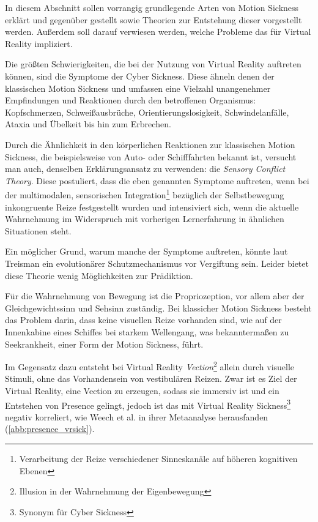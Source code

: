 In diesem Abschnitt sollen vorrangig grundlegende Arten von Motion Sickness erkl\"art und gegen\"uber gestellt sowie Theorien zur Entstehung dieser vorgestellt werden. Au{\ss}erdem soll darauf verwiesen werden, welche Probleme das f\"ur Virtual Reality impliziert.

Die gr\"o{\ss}ten Schwierigkeiten, die bei der Nutzung von Virtual Reality auftreten können, sind die Symptome der Cyber Sickness. Diese \"ahneln denen der klassischen Motion Sickness und umfassen eine Vielzahl unangenehmer Empfindungen und Reaktionen durch den betroffenen Organismus: Kopfschmerzen, Schwei{\ss}ausbr\"uche, Orientierungslosigkeit, Schwindelanf\"alle, Ataxia und \"Ubelkeit bis hin zum Erbrechen\cite{LaViola:2000:CSinVR, Kolasinski:1998:SympCS}.

Durch die \"Ahnlichkeit in den k\"orperlichen Reaktionen zur klassischen Motion Sickness, die beispielsweise von Auto- oder Schifffahrten bekannt ist, versucht man auch, denselben Erkl\"arungsansatz zu verwenden: die \textit{Sensory Conflict Theory}\cite{Kolasinski:1998:SympCS,Johnson:2005:SCT_Expl}.
Diese postuliert, dass die eben genannten Symptome auftreten, wenn bei der multimodalen, sensorischen Integration\footnote{ Verarbeitung der Reize verschiedener Sinneskan\"ale auf h\"oheren kognitiven Ebenen} bez\"uglich der Selbstbewegung inkongruente Reize festgestellt wurden und intensiviert sich, wenn die aktuelle Wahrnehmung im Widerspruch mit vorherigen Lernerfahrung in \"ahnlichen Situationen steht\cite{Reason:1975:MSexp}.

Ein m\"oglicher Grund, warum manche der Symptome auftreten, k\"onnte laut Treisman\cite{Treisman:1977:Toxic} ein evolution\"arer Schutzmechanismus vor Vergiftung sein. Leider bietet diese Theorie wenig M\"oglichkeiten zur Pr\"adiktion.

F\"ur die Wahrnehmung von Bewegung ist die Propriozeption, vor allem aber der Gleichgewichtssinn und Sehsinn zust\"andig.
Bei klassicher Motion Sickness besteht das Problem darin, dass keine visuellen Reize vorhanden sind, wie auf der Innenkabine eines Schiffes bei starkem Wellengang, was bekannterma{\ss}en zu Seekrankheit, einer Form der Motion Sickness, f\"uhrt.

Im Gegensatz dazu entsteht bei Virtual Reality \textit{Vection}\footnote{ Illusion in der Wahrnehmung der Eigenbewegung} allein durch visuelle Stimuli, ohne das Vorhandensein von vestibul\"aren Reizen.
Zwar ist es Ziel der Virtual Reality, eine Vection zu erzeugen, sodass sie immersiv ist und ein Entstehen von Presence gelingt, jedoch ist das mit Virtual Reality Sickness\footnote{Synonym f\"ur Cyber Sickness} negativ korreliert, wie Weech et al.\cite{Weech:2019:PresenceCS} in ihrer Metaanalyse herausfanden (\autoref{abb:presence_vrsick}).


